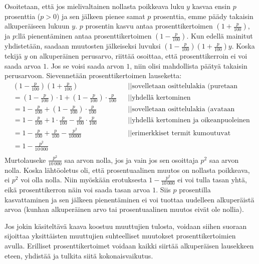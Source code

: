 \begin{esimerkki}
Osoitetaan, että jos mielivaltainen nollasta poikkeava luku $y$ kasvaa ensin $p$ prosenttia ($p>0$) ja sen jälkeen pienee samat $p$ prosenttia, emme päädy takaisin alkuperäiseen lukuun $y$. $p$ prosentin kasvu antaa prosenttikertoimen $(1+\frac{p}{100})$, ja $p$:llä pienentäminen antaa prosenttikertoimen $(1-\frac{p}{100})$. Kun edellä mainitut yhdistetään, saadaan muutosten jälkeiseksi luvuksi $(1-\frac{p}{100})(1+\frac{p}{100})y$. Koska tekijä $y$ on alkuperäinen perusarvo, riittää osoittaa, että prosenttikerroin ei voi saada arvoa $1$. Jos se voisi saada arvon $1$, niin olisi mahdollista päätyä takaisin perusarvoon. Sievennetään prosenttikertoimen lauseketta:
\begin{align*}
&(1-\frac{p}{100})(1+\frac{p}{100}) && || \text{sovelletaan osittelulakia (puretaan oikeanpuoleiset sulkeet)} \\
&=(1-\frac{p}{100})\cdot 1 + (1-\frac{p}{100})\cdot \frac{p}{100} && || \text{yhdellä kertominen} \\
&=1-\frac{p}{100} + (1-\frac{p}{100})\cdot \frac{p}{100} && || \text{sovelletaan osittelulakia (avataan oikeanpuoleiset sulkeet)} \\
&=1-\frac{p}{100} + 1\cdot \frac{p}{100}-\frac{p}{100}\cdot \frac{p}{100}  && || \text{yhdellä kertominen ja oikeanpuoleinen kertolasku} \\
&=1-\frac{p}{100} + \frac{p}{100}-\frac{p^2}{10000}  && || \text{erimerkkiset termit kumoutuvat} \\
&=1-\frac{p^2}{10\,000}  && \\
\end{align*}
Murtolauseke $\frac{p^2}{10\,000}$ saa arvon nolla, jos ja vain jos sen osoittaja $p^2$ saa arvon nolla. Koska lähtöoletus oli, että prosentuaalinen muutos on nollasta poikkeava, ei $p^2$ voi olla nolla. Niin myöskään erotuksesta $1-\frac{p^2}{10\,000}$ ei voi tulla tasan yhtä, eikä prosenttikerron näin voi saada tasan arvoa $1$. Siis $p$ prosentilla kasvattaminen ja sen jälkeen pienentäminen ei voi tuottaa uudelleen alkuperäistä arvoa (kunhan alkuperäinen arvo tai prosentuaalinen muutos eivät ole nollia).
\end{esimerkki}


Jos jokin käsiteltävä kaava koostuu muuttujien tulosta, voidaan siihen suoraan sijoittaa yksittäisten muuttujien suhteelliset muutokset prosenttikertoimien avulla. Erilliset prosenttikertoimet voidaan kaikki siirtää alkuperäisen lausekkeen eteen, yhdistää ja tulkita siitä kokonaisvaikutus.


